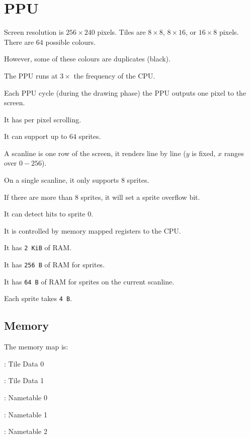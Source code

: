 %

\chapter{PPU}

Screen resolution is $256 \times 240$ pixels.
Tiles are $8 \times 8$, $8 \times 16$, or $16 \times 8$ pixels.
There are $64$ possible colours.

However, some of these colours are duplicates (black).

The PPU runs at $3 \times$ the frequency of the CPU.

Each PPU cycle (during the drawing phase) the PPU outputs one pixel to the
screen.

It has per pixel scrolling.

It can support up to $64$ sprites.

A scanline is one row of the screen, it renders line by line ($y$ is fixed, $x$
ranges over $0-256$).

On a single scanline, it only supports $8$ sprites.

If there are more than $8$ sprites, it will set a sprite overflow bit.

It can detect hits to sprite 0.

It is controlled by memory mapped registers to the CPU.

It has \texttt{2 KiB} of RAM.

It has \texttt{256 B} of RAM for sprites.

It has \texttt{64 B} of RAM for sprites on the current scanline.

Each sprite takes \texttt{4 B}.

\section{Memory}

The memory map is:

: Tile Data 0

: Tile Data 1

: Nametable 0

: Nametable 1

: Nametable 2

